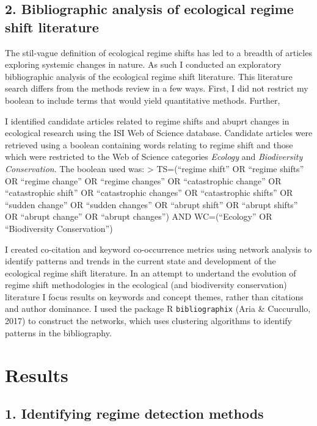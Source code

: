 \documentclass[12pt,twoside,openany]{reedthesis}
\begin{document}
\hypertarget{bibliographic-analysis-of-ecological-regime-shift-literature}{%
\subsection{2. Bibliographic analysis of ecological regime shift literature}\label{bibliographic-analysis-of-ecological-regime-shift-literature}}

The stil-vague definition of ecological regime shifts has led to a breadth of articles exploring systemic changes in nature. As such I conducted an exploratory bibliographic analysis of the ecological regime shift literature. This literature search differs from the methods review in a few ways. First, I did not restrict my boolean to include terms that would yield quantitative methods. Further,

I identified candidate articles related to regime shifts and abuprt changes in ecological research using the ISI Web of Science database. Candidate articles were retrieved using a boolean containing words relating to regime shift and those which were restricted to the Web of Science categories \emph{Ecology} and \emph{Biodiversity Conservation}. The boolean used was:
\textgreater{} TS=(``regime shift'' OR ``regime shifts'' OR ``regime change'' OR ``regime changes'' OR ``catastrophic change'' OR ``catastrophic shift'' OR ``catastrophic changes'' OR ``catastrophic shifts'' OR ``sudden change'' OR ``sudden changes'' OR ``abrupt shift'' OR ``abrupt shifts'' OR ``abrupt change'' OR ``abrupt changes'') AND WC=(``Ecology'' OR ``Biodiversity Conservation'')

I created co-citation and keyword co-occurrence metrics using network analysis to identify patterns and trends in the current state and development of the ecological regime shift literature. In an attempt to undertand the evolution of regime shift methodologies in the ecological (and biodiversity conservation) literature I focus results on keywords and concept themes, rather than citations and author dominance. I used the package R \texttt{bibliographix} (Aria \& Cuccurullo, 2017) to construct the networks, which uses clustering algorithms to identify patterns in the bibliography.

\hypertarget{results}{%
\section{Results}\label{results}}

\hypertarget{identifying-regime-detection-methods-1}{%
\subsection{1. Identifying regime detection methods}\label{identifying-regime-detection-methods-1}}
\end{document}
